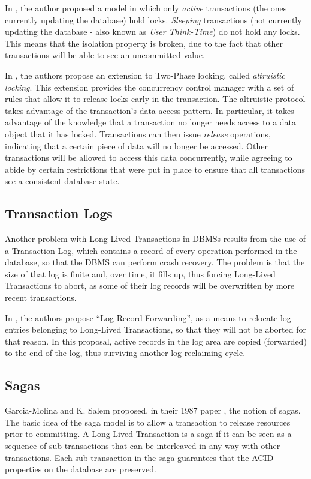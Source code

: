 In \cite{gray1981transaction}, the author proposed a model in which
only {\it active} transactions (the ones currently updating the
database) hold locks. {\it Sleeping} transactions (not currently
updating the database - also known as {\it User Think-Time}) do not
hold any locks. This means that the isolation property is broken, due
to the fact that other transactions will be able to see an uncommitted
value.

In \cite{salem1989altruistic}, the authors propose an extension to
Two-Phase locking, called {\it altruistic locking}. This extension
provides the concurrency control manager with a set of rules that
allow it to release locks early in the transaction. The altruistic
protocol takes advantage of the transaction's data access pattern. In
particular, it takes advantage of the knowledge that a transaction no
longer needs access to a data object that it has locked. Transactions
can then issue {\it release} operations, indicating that a certain
piece of data will no longer be accessed. Other transactions will be
allowed to access this data concurrently, while agreeing to abide by
certain restrictions that were put in place to ensure that all
transactions see a consistent database state.

\subsection{Transaction Logs}

Another problem with Long-Lived Transactions in DBMSs results from the
use of a Transaction Log, which contains a record of every operation
performed in the database, so that the DBMS can perform crash
recovery. The problem is that the size of that log is finite and, over
time, it fills up, thus forcing Long-Lived Transactions to abort, as
some of their log records will be overwritten by more recent
transactions.

In \cite{hagmann1991implementing}, the authors propose ``Log Record
Forwarding'', as a means to relocate log entries belonging to
Long-Lived Transactions, so that they will not be aborted for that
reason. In this proposal, active records in the log area are copied
(forwarded) to the end of the log, thus surviving another
log-reclaiming cycle.

\subsection{Sagas}
\label{sec:sagas}

Garcia-Molina and K. Salem proposed, in their 1987 paper
\cite{garcia1987sagas}, the notion of sagas. The basic idea of the
saga model is to allow a transaction to release resources prior to
committing. A Long-Lived Transaction is a saga if it can be seen as a
sequence of sub-transactions that can be interleaved in any way with
other transactions. Each sub-transaction in the saga guarantees that
the ACID properties on the database are preserved.

